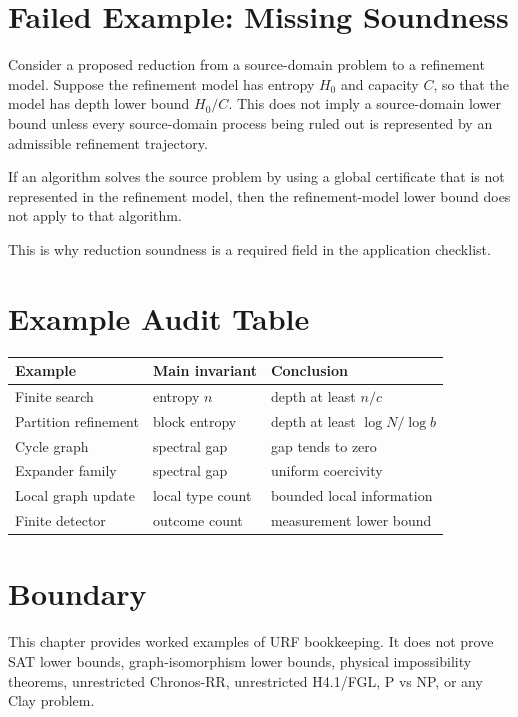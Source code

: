 \section{Failed Example: Missing Soundness}

Consider a proposed reduction from a source-domain problem to a refinement
model. Suppose the refinement model has entropy \(H_0\) and capacity \(C\), so
that the model has depth lower bound \(H_0/C\). This does not imply a
source-domain lower bound unless every source-domain process being ruled out
is represented by an admissible refinement trajectory.

\begin{example}
If an algorithm solves the source problem by using a global certificate that
is not represented in the refinement model, then the refinement-model lower
bound does not apply to that algorithm.
\end{example}

This is why reduction soundness is a required field in the application
checklist.

\section{Example Audit Table}

\begin{center}
\begin{tabular}{lll}
\toprule
Example & Main invariant & Conclusion \\
\midrule
Finite search & entropy \(n\) & depth at least \(n/c\) \\
Partition refinement & block entropy & depth at least \(\log N/\log b\) \\
Cycle graph & spectral gap & gap tends to zero \\
Expander family & spectral gap & uniform coercivity \\
Local graph update & local type count & bounded local information \\
Finite detector & outcome count & measurement lower bound \\
\bottomrule
\end{tabular}
\end{center}

\section{Boundary}

This chapter provides worked examples of URF bookkeeping. It does not prove
SAT lower bounds, graph-isomorphism lower bounds, physical impossibility
theorems, unrestricted Chronos-RR, unrestricted H4.1/FGL, P vs NP, or any Clay
problem.
